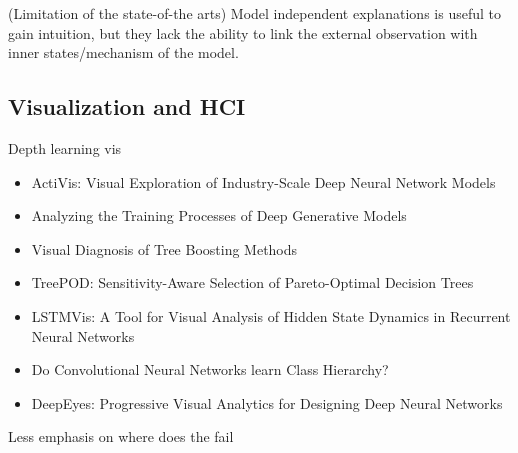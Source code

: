 (Limitation of the state-of-the arts)
Model independent explanations is useful to gain intuition, but they lack the ability to link the external observation with inner states/mechanism of the model.

\subsection{Visualization and HCI}
Depth learning vis
\begin{itemize}
    \item ActiVis: Visual Exploration of Industry-Scale Deep Neural Network Models
    \item Analyzing the Training Processes of Deep Generative Models
    \item Visual Diagnosis of Tree Boosting Methods
    \item TreePOD: Sensitivity-Aware Selection of Pareto-Optimal Decision Trees
    \item LSTMVis: A Tool for Visual Analysis of Hidden State Dynamics in Recurrent Neural Networks
    \item Do Convolutional Neural Networks learn Class Hierarchy?
    \item DeepEyes: Progressive Visual Analytics for Designing Deep Neural Networks
\end{itemize}

Less emphasis on where does the fail
